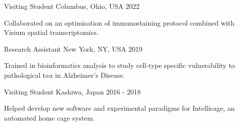 %
%
%

\vspace*{0.35cm}

\begin{cventries}

    {Visiting Student}
    {Columbus, Ohio, USA}
    {2022}
    {\begin{cvitems}
        \item Collaborated on an optimisation of immunostaining protocol combined with Visium spatial transcriptomics.
    \end{cvitems}\vspace{1.5\baselineskip}}

    \vspace*{0.2cm}

    {Research Assistant}
    {New York, NY, USA}
    {2019}
    {\begin{cvitems}
        \item Trained in bioinformatics analysis to study cell-type specific vulnerability to pathological tau in Alzheimer's Disease.
    \end{cvitems}\vspace{1.5\baselineskip}}

    \vspace*{0.2cm}

    {Visiting Student}
    {Kashiwa, Japan}
    {2016 - 2018}
    {\begin{cvitems}
        \item Helped develop new software and experimental paradigms for Intellicage, an automated home cage system.
    \end{cvitems}\vspace{1.5\baselineskip}}


\end{cventries}
